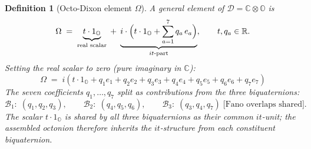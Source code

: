 \documentclass[12pt,a4paper]{article}
\newtheorem{definition}[theorem]{Definition}
\theoremstyle{remark}
\begin{document}
\begin{definition}[Octo-Dixon element $\Omega$]\label{def:omega}
A general element of $\mathcal{D}=\mathbb{C}\otimes\mathbb{O}$ is
\[
  \Omega
  \;=\;
  \underbrace{t\cdot 1_{\mathbb{O}}}_{\text{real scalar}}
  \;+\;
  \underbrace{i\cdot\Bigl(t\cdot 1_{\mathbb{O}}+\sum_{a=1}^{7}q_a\,e_a\Bigr)}_{it\text{-part}},
  \qquad t,q_a\in\mathbb{R}.
\]
Setting the real scalar to zero (pure imaginary in $\mathbb{C}$):
\[
  \boxed{
  \Omega \;=\; i\!\left(t\cdot 1_{\mathbb{O}} + q_1 e_1+q_2 e_2+q_3 e_3
                      +q_4 e_4+q_5 e_5+q_6 e_6+q_7 e_7\right)
  }
\]
The seven coefficients $q_1,\ldots,q_7$ split as contributions from
the three biquaternions:
\[
  \mathcal{B}_1:\;(q_1,q_2,q_3),\qquad
  \mathcal{B}_2:\;(q_4,q_5,q_6),\qquad
  \mathcal{B}_3:\;(q_3,q_4,q_7)\;\text{[Fano overlaps shared]}.
\]
The scalar $t\cdot 1_{\mathbb{O}}$ is shared by all three biquaternions
as their common $it$-unit; the assembled octonion therefore
\emph{inherits} the $it$-structure from each constituent biquaternion.
\end{definition}
\end{document}
